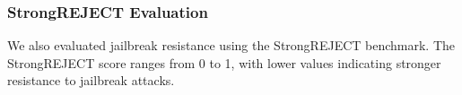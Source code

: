\documentclass[conference,compsoc]{IEEEtran}
\begin{document}
\subsubsection{StrongREJECT Evaluation}
We also evaluated jailbreak resistance using the StrongREJECT benchmark. The StrongREJECT score ranges from 0 to 1, with lower values indicating stronger resistance to jailbreak attacks.


\end{document}
